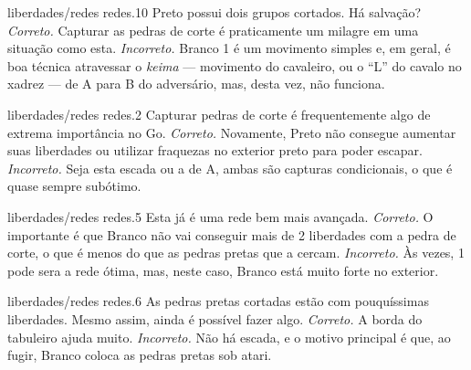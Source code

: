 \problemAnswerDiagram
  {liberdades/redes}
  {redes.10}
  {Preto possui dois grupos cortados. Há salvação?}
  {\emph{Correto.} Capturar as pedras de corte é praticamente um milagre em uma situação como esta.}
  {\emph{Incorreto.} Branco 1 é um movimento simples e, em geral, é boa técnica atravessar o \emph{keima} --- movimento do cavaleiro, ou o ``L'' do cavalo no xadrez --- de A para B do adversário, mas, desta vez, não funciona.}

\problemAnswerDiagram
  {liberdades/redes}
  {redes.2}
  {Capturar pedras de corte é frequentemente algo de extrema importância no Go.}
  {\emph{Correto.} Novamente, Preto não consegue aumentar suas liberdades ou utilizar fraquezas no exterior preto para poder escapar.}
  {\emph{Incorreto.} Seja esta escada ou a de A, ambas são capturas condicionais, o que é quase sempre subótimo.}

\problemAnswerDiagram
  {liberdades/redes}
  {redes.5}
  {Esta já é uma rede bem mais avançada.}
  {\emph{Correto.} O importante é que Branco não vai conseguir mais de 2 liberdades com a pedra de corte, o que é menos do que as pedras pretas que a cercam.}
  {\emph{Incorreto.} Às vezes, 1 pode sera a rede ótima, mas, neste caso, Branco está muito forte no exterior.}

\problemAnswerDiagram
  {liberdades/redes}
  {redes.6}
  {As pedras pretas cortadas estão com pouquíssimas liberdades. Mesmo assim, ainda é possível fazer algo.}
  {\emph{Correto.} A borda do tabuleiro ajuda muito.}
  {\emph{Incorreto.} Não há escada, e o motivo principal é que, ao fugir, Branco coloca as pedras pretas sob atari.}